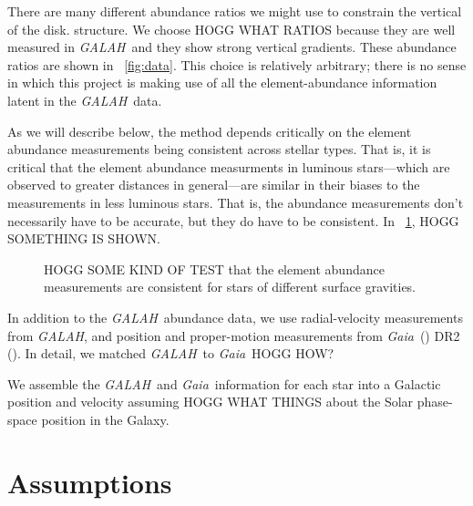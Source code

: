 \documentclass[modern]{aastex62}
\newcommand{\acronym}[1]{{\small{#1}}}
\newcommand{\project}[1]{\textsl{#1}}
\newcommand{\galah}{\project{\acronym{GALAH}}}
\newcommand{\gaia}{\project{Gaia}}
\begin{document}
There are many different abundance ratios we might use to constrain the vertical of the disk.
structure.
We choose HOGG WHAT RATIOS because they are well measured in \galah\ and they show strong
vertical gradients.
These abundance ratios are shown in \figurename~\ref{fig:data}.
This choice is relatively arbitrary; there is no sense in which this project is making use
of all the element-abundance information latent in the \galah\ data.

As we will describe below, the method depends critically on the element abundance
measurements being consistent across stellar types.
That is, it is critical that the element abundance measurments in luminous
stars---which are observed to greater distances in general---are similar in their
biases to the measurements in less luminous stars.
That is, the abundance measurements don't necessarily have to be accurate, but
they do have to be consistent.
In \figurename~\ref{fig:testing}, HOGG SOMETHING IS SHOWN.
\begin{figure}
\caption{HOGG SOME KIND OF TEST that the element abundance measurements
are consistent for stars of different surface gravities.\label{fig:testing}}
\end{figure}

In addition to the \galah\ abundance data, we use radial-velocity measurements from \galah,
and position and proper-motion measurements from \gaia\ (\citealt{gaia})
\acronym{DR2} (\citealt{gaiadr2}).
In detail, we matched \galah\ to \gaia\ HOGG HOW?

We assemble the \galah\ and \gaia\ information for each star into a Galactic position and
velocity assuming HOGG WHAT THINGS about the Solar phase-space position in the Galaxy.

\section{Assumptions}
\end{document}

